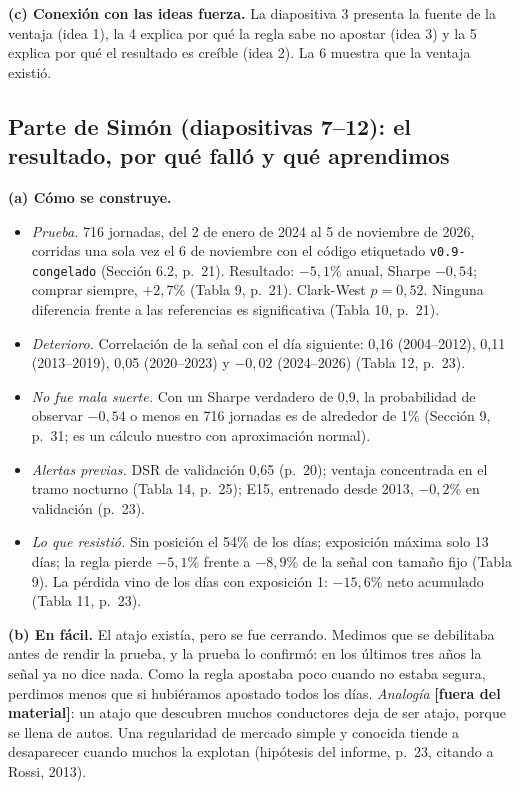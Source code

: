 \documentclass[11pt]{article}
\newcommand{\fuera}{\textcolor{red!60!black}{\textbf{[fuera del material]}}}
\begin{document}
\textbf{(c) Conexión con las ideas fuerza.} La diapositiva 3 presenta la fuente de la ventaja (idea 1), la 4 explica por qué la regla sabe no apostar (idea 3) y la 5 explica por qué el resultado es creíble (idea 2). La 6 muestra que la ventaja existió.

\subsection*{Parte de Simón (diapositivas 7--12): el resultado, por qué falló y qué aprendimos}
\textbf{(a) Cómo se construye.}
\begin{itemize}
\item \emph{Prueba.} 716 jornadas, del 2 de enero de 2024 al 5 de noviembre de 2026, corridas una sola vez el 6 de noviembre con el código etiquetado \texttt{v0.9-congelado} (Sección 6.2, p.~21). Resultado: $-5{,}1$\% anual, Sharpe $-0{,}54$; comprar siempre, $+2{,}7$\% (Tabla 9, p.~21). Clark-West \(p=0{,}52\). Ninguna diferencia frente a las referencias es significativa (Tabla 10, p.~21).
\item \emph{Deterioro.} Correlación de la señal con el día siguiente: 0,16 (2004--2012), 0,11 (2013--2019), 0,05 (2020--2023) y $-0{,}02$ (2024--2026) (Tabla 12, p.~23).
\item \emph{No fue mala suerte.} Con un Sharpe verdadero de 0,9, la probabilidad de observar $-0{,}54$ o menos en 716 jornadas es de alrededor de 1\% (Sección 9, p.~31; es un cálculo nuestro con aproximación normal).
\item \emph{Alertas previas.} DSR de validación 0,65 (p.~20); ventaja concentrada en el tramo nocturno (Tabla 14, p.~25); E15, entrenado desde 2013, $-0{,}2$\% en validación (p.~23).
\item \emph{Lo que resistió.} Sin posición el 54\% de los días; exposición máxima solo 13 días; la regla pierde $-5{,}1$\% frente a $-8{,}9$\% de la señal con tamaño fijo (Tabla 9). La pérdida vino de los días con exposición 1: $-15{,}6$\% neto acumulado (Tabla 11, p.~23).
\end{itemize}
\textbf{(b) En fácil.} El atajo existía, pero se fue cerrando. Medimos que se debilitaba antes de rendir la prueba, y la prueba lo confirmó: en los últimos tres años la señal ya no dice nada. Como la regla apostaba poco cuando no estaba segura, perdimos menos que si hubiéramos apostado todos los días.
\emph{Analogía} \fuera: un atajo que descubren muchos conductores deja de ser atajo, porque se llena de autos. Una regularidad de mercado simple y conocida tiende a desaparecer cuando muchos la explotan (hipótesis del informe, p.~23, citando a Rossi, 2013).
\end{document}
